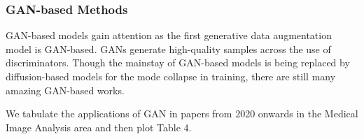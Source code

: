 \documentclass[preprint,12pt,authoryear]{elsarticle}
\begin{document}
\subsubsection{GAN-based Methods}
GAN-based models gain attention as the first generative data augmentation model is GAN-based. GANs generate high-quality samples across the use of discriminators. Though the mainstay of GAN-based models is being replaced by diffusion-based models for the mode collapse in training, there are still many amazing GAN-based works. 

We tabulate the applications of GAN in papers from 2020 onwards in the Medical Image Analysis area and then plot Table 4.
\renewcommand{\arraystretch}{1.7}
\end{document}
